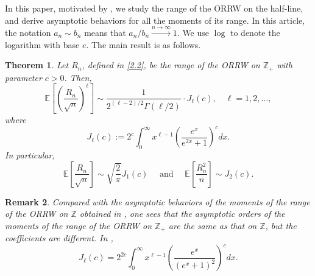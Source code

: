 \documentclass[12pt]{article}
\newtheorem{thm}{Theorem}[section]
\newtheorem{rem}[thm]{Remark}
\numberwithin{equation}{section}
\begin{document}
In this paper, motivated  by \cite{PS}, we study the range of the ORRW on the half-line, and derive asymptotic behaviors for all the moments of its range.
In this article,
the notation  $a_{n}\sim b_{n}$ means that  $a_{n}/b_{n}\stackrel{n \to \infty}{\longrightarrow }1$. We use  $\log$  to denote the logarithm with base $e$.
The main result is as follows.


\begin{thm}\label{thm-1.1}
 Let $R_{n}$, defined in \eqref{2.2}, be  the range of the ORRW on $\mathbb{Z}_{+}$ with parameter $c>0$. Then,
\begin{equation*}
\mathbb{E}\left[\left(\frac{R_{n}}{\sqrt{n}}\right)^{\ell}\right] \sim \frac{1}{2^{(\ell-2)/2}
\Gamma(\ell/2)} \cdot J_{\ell}(c),\quad \ell=1,2, \ldots,
\end{equation*}
where
\begin{equation*}
J_{\ell}(c):=2^{c} \int_{0}^{\infty} x^{\ell-1}\left(\frac{e^{x}}{e^{2x}+1}\right)^{c}dx.
\end{equation*}
In particular,
\begin{equation*}
\mathbb{E}\left[\frac{R_{n}}{\sqrt{n}}\right] \sim \sqrt{\frac{2}{\pi}} J_{1}(c) \quad \text { and } \quad \mathbb{E}\left[\frac{R_{n}^{2}}{n}\right] \sim J_{2}(c).
\end{equation*}
\end{thm}

\begin{rem}
Compared with the asymptotic behaviors of the moments of the range of the ORRW on $\mathbb{Z}$ obtained in \cite{PS}, one sees that the asymptotic orders of the moments of the range of the ORRW on
$\mathbb{Z}_+$ are the same as that on $\mathbb{Z}$,
but the  coefficients are different. In \cite{PS},
\begin{equation*}
J_{\ell}(c)=2^{2c} \int_{0}^{\infty} x^{\ell-1}\left(\frac{e^{x}}{(e^x+1)^2}\right)^{c} d x.
\end{equation*}
\end{rem}

\medskip
\end{document}
